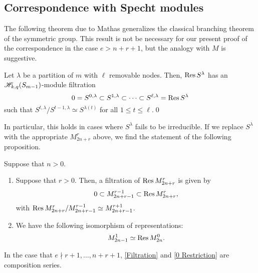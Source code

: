 \documentclass{amsart}
\begin{document}
\subsection{Correspondence with Specht modules}
The following theorem due to Mathas \cite[Thm.~5.5]{Mathas-article} generalizes the classical branching theorem of the symmetric group.
This result is not be necessary for our present proof of the correspondence in the case $e > n + r + 1$, but the analogy with $M$ is suggestive.
\begin{theorem}
  Let $\lambda$ be a partition of $m$ with $\ell$ removable nodes.
  Then, $\operatorname{Res} S^\lambda$ has an $\mathscr{H}_{k,q}(S_{m-1})$-module filtration
  \[
    0 = S^{0,\lambda} \subset S^{1,\lambda} \subset \cdots \subset S^{\ell,\lambda} = \operatorname{Res} S^\lambda
  \]
  such that $S^{t,\lambda} / S^{t-1,\lambda} \simeq S^{\lambda(t)}$ for all $1 \leq t \leq \ell$.\qed
\end{theorem}
In particular, this holds in cases where $S^\lambda$ fails to be irreducible.
If we replace $S^\lambda$ with the appropriate $M_{2n + r}^r$ above, we find the statement of the following proposition.
\begin{proposition}Suppose that $n > 0$.
  
  \begin{enumerate}[label={(\roman*)}]
    \item
    Suppose that $r > 0$.
    Then, a filtration of $\operatorname{Res} M_{2n + r}^r$ is given by
    \begin{equation}
      0 \subset M_{2n + r - 1}^{r-1} \subset \operatorname{Res} M_{2n + r}^r, \label{Filtration}
     \end{equation}
     with $\operatorname{Res} M_{2n + r}^r / M_{2n + r - 1}^{r-1} \simeq M_{2n + r - 1}^{r + 1}$. 
    \item
      We have the following isomorphism of representations:
      \begin{equation}
        M_{2n - 1}^1 \simeq \operatorname{Res} M_{2n}^0. \label{0 Restriction}
       \end{equation}
  \end{enumerate}
  In the case that $e \nmid r+1,\dots,n + r + 1$, \eqref{Filtration} and \eqref{0 Restriction} are composition series.
\end{proposition}
\end{document}
